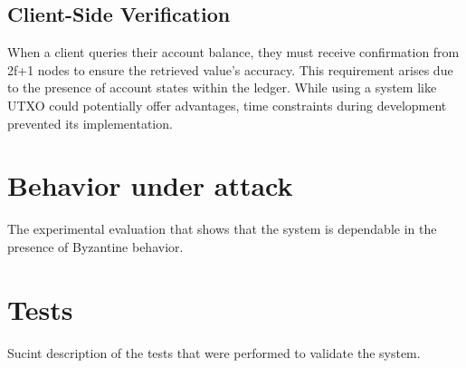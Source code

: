 \subsection{Client-Side Verification}
When a client queries their account balance, they must receive confirmation from 2f+1 nodes to ensure the retrieved value's accuracy. This requirement arises due to the presence of account states within the ledger. While using a system like UTXO could potentially offer advantages, time constraints during development prevented its implementation.

\section{Behavior under attack}

The experimental evaluation that shows that the system is dependable in the
presence of Byzantine behavior.

\section{Tests}

Sucint description of the tests that were performed to validate the system.








